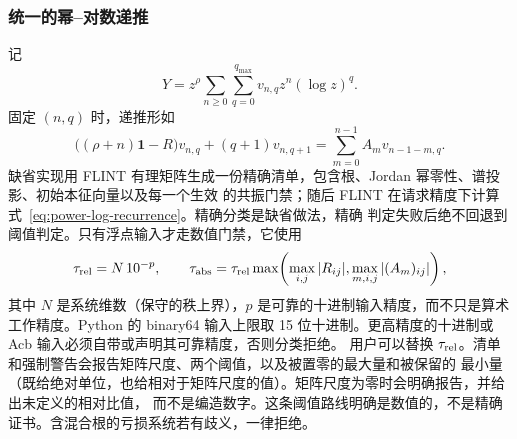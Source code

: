 \documentclass[11pt,a4paper]{ctexart}
\newcommand{\Id}{\mathbf 1}
\renewcommand{\_}{\origunderscore\allowbreak}
\begin{document}
\subsubsection{统一的幂--对数递推}

记
\begin{equation}
  Y=z^\rho\sum_{n\geq0}\sum_{q=0}^{q_{\max}}
  v_{n,q}z^n(\log z)^q.
\end{equation}
固定 $(n,q)$ 时，递推形如
\begin{equation}
  \bigl((\rho+n)\Id-R\bigr)v_{n,q}
  +(q+1)v_{n,q+1}
  =\sum_{m=0}^{n-1}A_m v_{n-1-m,q}.
  \label{eq:power-log-recurrence}
\end{equation}
缺省实现用 FLINT 有理矩阵生成一份精确清单，包含根、Jordan 幂零性、谱投影、初始本征向量以及每一个生效
的共振门禁；随后 FLINT 在请求精度下计算式~\eqref{eq:power-log-recurrence}。精确分类是缺省做法，精确
判定失败后绝不回退到阈值判定。只有浮点输入才走数值门禁，它使用
\begin{equation}
  \tau_{\rm rel}=N\,10^{-p},
  \qquad
  \tau_{\rm abs}=\tau_{\rm rel}
  \max\!\left(\max_{i,j}|R_{ij}|,\max_{m,i,j}|(A_m)_{ij}|\right),
  \label{eq:numerical-log-threshold}
\end{equation}
其中 $N$ 是系统维数（保守的秩上界），$p$ 是可靠的十进制输入精度，而不只是算术工作精度。Python 的
binary64 输入上限取 15 位十进制。更高精度的十进制或 Acb 输入必须自带或声明其可靠精度，否则分类拒绝。
用户可以替换 $\tau_{\rm rel}$。清单和强制警告会报告矩阵尺度、两个阈值，以及被置零的最大量和被保留的
最小量（既给绝对单位，也给相对于矩阵尺度的值）。矩阵尺度为零时会明确报告，并给出未定义的相对比值，
而不是编造数字。这条阈值路线明确是数值的，不是精确证书。含混合根的亏损系统若有歧义，一律拒绝。
\end{document}
